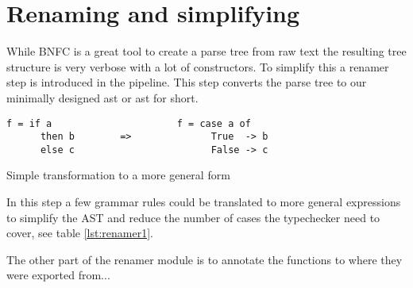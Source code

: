 \section{Renaming and simplifying}


While BNFC is a great tool to create a parse tree from raw text the resulting 
tree structure is very verbose with a lot of constructors. To simplify this a
renamer step is introduced in the pipeline. This step converts the parse tree
to our minimally designed \acrlong{ast} or \acrshort{ast} for short. 

\begin{table}
\begin{lstlisting} 
f = if a                      f = case a of
      then b        =>              True  -> b
      else c                        False -> c
\end{lstlisting}
\caption{Simple transformation to a more general form}
\label{lst:renamer1}
\end{table}

In this step a few grammar rules could be translated to more general expressions
to simplify the AST and reduce the number of cases the typechecker need to cover, see
table \ref{lst:renamer1}.

The other part of the renamer module is to annotate the functions to where they
were exported from...

